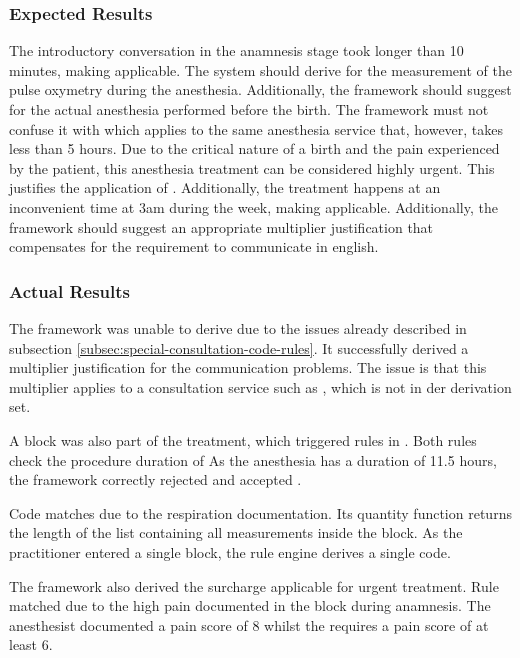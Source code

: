 \subsubsection{Expected Results}
The introductory conversation in the anamnesis stage took longer than 10 minutes, making  applicable.
The system should derive  for the measurement of the pulse oxymetry during the anesthesia.
Additionally, the framework should suggest  for the actual anesthesia performed before the birth.
The framework must not confuse it with  which applies to the same anesthesia service that, however, takes less than 5 hours.
Due to the critical nature of a birth and the pain experienced by the patient, this anesthesia treatment can be considered highly urgent.
This justifies the application of .
Additionally, the treatment happens at an inconvenient time at 3am during the week,
making  applicable.
Additionally, the framework should suggest an appropriate multiplier justification that compensates for the requirement to communicate in english.

\subsubsection{Actual Results}

The framework was unable to derive  due to the issues already described in subsection \ref{subsec:special-consultation-code-rules}.
It successfully derived a multiplier justification for the communication problems.
The issue is that this multiplier applies to a consultation service such as , which is not in der derivation set.

A  block was also part of the treatment, which triggered rules in .
Both rules check the procedure duration of 
As the anesthesia has a duration of 11.5 hours, the framework correctly rejected  and accepted .

Code  matches due to the respiration documentation.
Its quantity function returns the length of the list containing all measurements inside the  block.
As the practitioner entered a single block, the rule engine derives a single  code.

The framework also derived the  surcharge applicable for urgent treatment.
Rule \addref matched due to the high pain documented in the  block during anamnesis.
The anesthesist documented a pain score of 8 whilst the  requires a pain score of at least 6.


